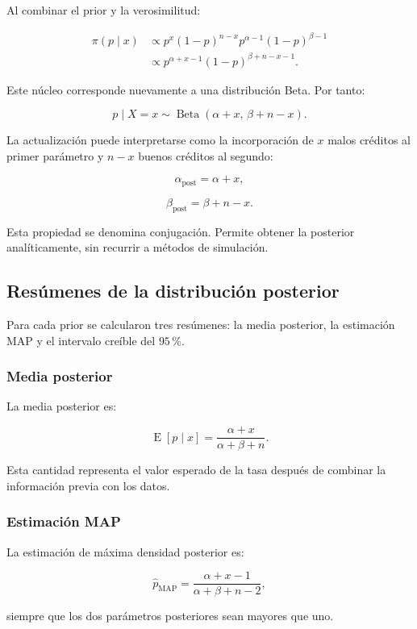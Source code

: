 Al combinar el prior y la verosimilitud:

\[
\begin{aligned}
\pi(p\mid x)
&\propto
p^x(1-p)^{n-x}
p^{\alpha-1}(1-p)^{\beta-1}\\
&\propto
p^{\alpha+x-1}
(1-p)^{\beta+n-x-1}.
\end{aligned}
\]

Este núcleo corresponde nuevamente a una distribución Beta. Por tanto:

\[
p\mid X=x
\sim
\operatorname{Beta}
\left(
    \alpha+x,\,
    \beta+n-x
\right).
\]

La actualización puede interpretarse como la incorporación de \(x\)
malos créditos al primer parámetro y \(n-x\) buenos créditos al segundo:

\[
\alpha_{\mathrm{post}}
=
\alpha+x,
\]

\[
\beta_{\mathrm{post}}
=
\beta+n-x.
\]

Esta propiedad se denomina conjugación. Permite obtener la posterior
analíticamente, sin recurrir a métodos de simulación.

\subsection{Resúmenes de la distribución posterior}

Para cada prior se calcularon tres resúmenes: la media posterior, la
estimación MAP y el intervalo creíble del \(95\,\%\).

\subsubsection{Media posterior}

La media posterior es:

\[
\operatorname{E}[p\mid x]
=
\frac{
    \alpha+x
}{
    \alpha+\beta+n
}.
\]

Esta cantidad representa el valor esperado de la tasa después de combinar
la información previa con los datos.

\subsubsection{Estimación MAP}

La estimación de máxima densidad posterior es:

\[
\widehat{p}_{\mathrm{MAP}}
=
\frac{
    \alpha+x-1
}{
    \alpha+\beta+n-2
},
\]

siempre que los dos parámetros posteriores sean mayores que uno.

